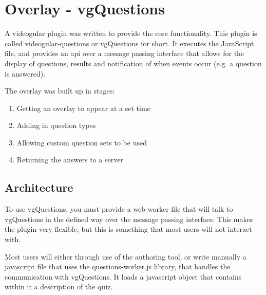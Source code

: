 \chapter{Overlay - vgQuestions} \label{Chapter:Overlay}

A videogular plugin was written to provide the core functionality. This plugin is called videogular-questions or vgQuestions for short. It executes the JavaScript file, and provides an api over a message passing interface that allows for the display of questions, results and notification of when events occur (e.g. a question is answered).


The overlay was built up in stages:
\begin{enumerate}
\item Getting an overlay to appear at a set time
\item Adding in question types
\item Allowing custom question sets to be used
\item Returning the answers to a server
\end{enumerate}

\section{Architecture}
\label{Section:Architecture}

To use vgQuestions, you must provide a web worker file that will talk to
vgQuestions in the defined way over the message passing interface. This makes
the plugin very flexible, but this is something that most users will not
interact with.

Most users will either through use of the authoring tool, or write manually a
javascript file that uses the questions-worker.js library, that handles the
communication with vgQuestions. It loads a javascript object that contains
within it a description of the quiz.


